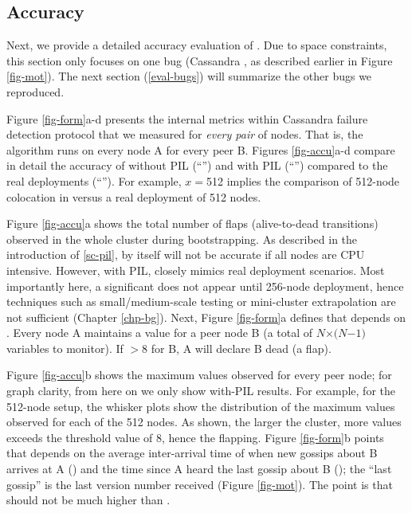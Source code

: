 \subsection{Accuracy}
\label{eval-accu}




Next, we provide a detailed accuracy evaluation of \sck.  Due to space
constraints, this section only focuses on one bug (Cassandra \caone
\cite{CA-One}, as described earlier in Figure \sec\ref{fig-mot}).  The
next section (\sec\ref{eval-bugs}) will summarize the other bugs we reproduced.


Figure \ref{fig-form}a-d presents the  internal metrics within
Cassandra failure detection protocol that we measured for {\em every pair}
of nodes.  That is, the algorithm runs on every node A for every peer B.
%
Figures \ref{fig-accu}a-d compare in detail the accuracy of \stest without
PIL (``'') and \stestp with PIL (``'') compared to
the real deployments (``'').
%
For example, $x$$=$512 implies the comparison of 512-node colocation in
\sck versus a real deployment of 512 nodes.



Figure \ref{fig-accu}a shows the total number of flaps (alive-to-dead
transitions) observed in the whole cluster during bootstrapping.  
As described in the introduction of \sec\ref{sc-pil}, 
\stest by itself will not be accurate if all nodes are CPU intensive. 
%
However, with PIL, \sck closely mimics real deployment scenarios.  Most
importantly here, a significant \flaps does not appear until 256-node
deployment, hence techniques such as small/medium-scale testing or
mini-cluster extrapolation are not sufficient (Chapter \ref{chp-bg}).
%
Next, Figure \ref{fig-form}a defines that \flaps depends on \phi
\cite{Hayashibara+04-PhiFailureDetector}.  Every node A maintains a \phi
value for a peer node B (a total of $N$$\times$$(N$$-$$1)$ variables to
monitor).  If \phi$>$8 for B, A will declare B dead (a flap).




Figure \ref{fig-accu}b shows the maximum \phi values observed for every
peer node; for graph clarity, from here on we only show with-PIL results.
%
For example, for the 512-node setup, the whisker plots show the
distribution of the maximum \phi values observed for each of the 512
nodes.  As shown, the larger the cluster, more \phi values exceeds the
threshold value of 8, hence the flapping.
%
Figure \ref{fig-form}b points that \phi depends on the average
inter-arrival time of when new gossips about B arrives at A (\gosAvg) and
the time since A heard the last gossip about B (\gosLast); the ``last
gossip'' is the last version number received (Figure \sec\ref{fig-mot}).
The point is that \gosLast should not be much higher than \gosAvg.



